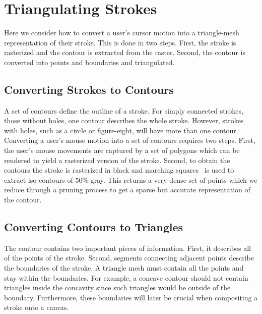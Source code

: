 \documentclass[review]{acmsiggraph}
\begin{document}
\section{Triangulating Strokes}

Here we consider how to convert a user's cursor motion into a triangle-mesh representation
of their stroke. This is done in two steps. First, the stroke is rasterized and the
contour is extracted from the raster. Second, the contour is converted into points and
boundaries and triangulated.

\subsection{Converting Strokes to Contours}
A set of contours define the outline of a stroke. For simply connected strokes, those without holes, 
one contour describes the whole stroke. However, strokes with holes, such as a circle or 
figure-eight, will have more than one contour.
Converting a user's mouse motion into a set of contours requires two steps.
First, the user's mouse movements are captured by a set of polygons which can be
rendered to yield a rasterized version of the stroke.
Second, to obtain the contours the stroke is rasterized in black and marching squares~\cite{lorensen1987}
is used to extract iso-contours of 50\% gray. This returns a very dense set of points 
which we reduce through a pruning process to
get a sparse but accurate representation of the contour.




\subsection{Converting Contours to Triangles}
The contour contains two important pieces of information. First, it describes all of the points of the stroke.
Second, segments connecting adjacent points describe the boundaries of the stroke. 
A triangle mesh must contain all the points and stay
within the boundaries. For example, a concave contour should not contain triangles inside the concavity since such triangles
would be outside of the boundary.
Furthermore, these boundaries will later be crucial when compositing a stroke onto a canvas.
\end{document}
